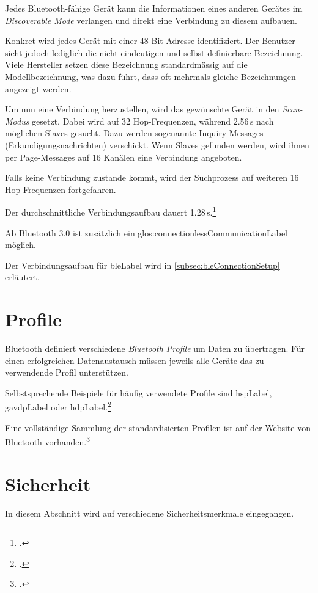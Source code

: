 Jedes Bluetooth-fähige Gerät kann die Informationen eines anderen Gerätes im \textit{Discoverable Mode} verlangen und direkt eine Verbindung zu diesem aufbauen.

Konkret wird jedes Gerät mit einer 48-Bit Adresse identifiziert. Der Benutzer sieht jedoch lediglich die nicht eindeutigen und selbst definierbare Bezeichnung. Viele Hersteller setzen diese Bezeichnung standardmässig auf die Modellbezeichnung, was dazu führt, dass oft mehrmals gleiche Bezeichnungen angezeigt werden.

Um nun eine Verbindung herzustellen, wird das gewünschte Gerät in den \textit{Scan-Modus} gesetzt.
Dabei wird auf 32 Hop-Frequenzen, während 2.56\,s nach möglichen Slaves gesucht. Dazu werden sogenannte Inquiry-Messages (Erkundigungsnachrichten) verschickt.
Wenn Slaves gefunden werden, wird ihnen per Page-Messages auf 16 Kanälen eine Verbindung angeboten.

Falls keine Verbindung zustande kommt, wird der Suchprozess auf weiteren 16 Hop-Frequenzen fortgefahren.

Der durchschnittliche Verbindungsaufbau dauert 1.28\,s.\footcite{Bluetooth_de_Wikipedia_2015-04-18}

Ab Bluetooth 3.0 ist zusätzlich ein \gls{glos:connectionlessCommunicationLabel} möglich.

Der Verbindungsaufbau für \gls{bleLabel} wird in \cref{subsec:bleConnectionSetup} erläutert.

\section{Profile}
Bluetooth definiert verschiedene \textit{Bluetooth Profile} um Daten zu übertragen.
Für einen erfolgreichen Datenaustausch müssen jeweils alle Geräte das zu verwendende Profil unterstützen.

Selbstsprechende Beispiele für häufig verwendete Profile sind \gls{hspLabel}, \gls{gavdpLabel} oder  \gls{hdpLabel}.\footcite{List_of_Bluetooth_profiles_Wikipedia_2015-04-27}

Eine vollständige Sammlung der standardisierten Profilen ist auf der Website von Bluetooth vorhanden.\footcite{Profiles_Overview_Bluetooth_Development_Portal_2015-04-27}


\section{Sicherheit}
In diesem Abschnitt wird auf verschiedene Sicherheitsmerkmale eingegangen.

